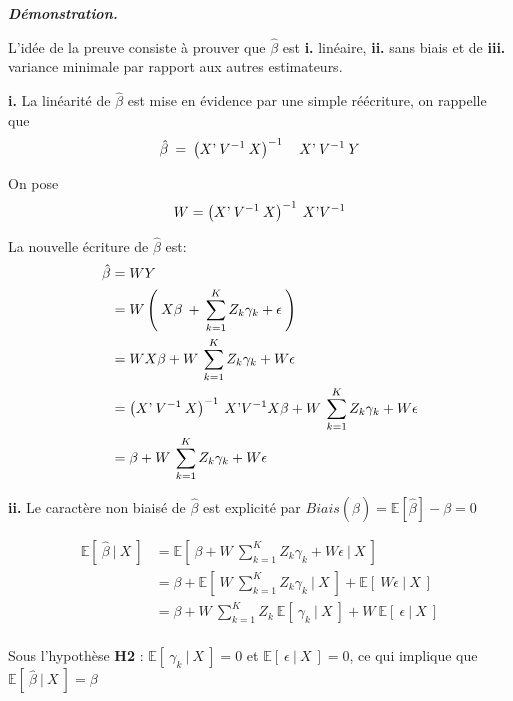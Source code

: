 \documentclass[12pt,fleqn]{book} %
\begin{document}
\vspace{1em}

\textbf{\textit{Démonstration.}}

\vspace{0.5em}

L'idée de la preuve consiste à prouver que $\hat{\beta}$ est \textbf{i.} linéaire, \textbf{ii.} sans biais et de \textbf{iii.} variance minimale par rapport aux autres estimateurs.

\vspace{0.5em}

\textbf{i.} La linéarité de $\hat{\beta}$ est mise en évidence par une simple réécriture, on rappelle que
\[
\hat{\beta}\:=\:\left(  X\textnormal{'}\:V^{-1} \: X \right)^{-1} \quad X\textnormal{'} \:V^{-1}\: Y
\]

On pose 
\[
W=\left(  X\textnormal{'}\:V^{-1} \: X \right)^{-1} \: X\textnormal{'}V^{-1}
\]

La nouvelle écriture de $\hat{\beta}$ est:
\begin{align*}
\hat{\beta} &= W Y\\
	&= W \left( \:X\beta\:+\:\sum_{k=1}^{K} Z_k \gamma_k + \epsilon\: \right) \\
    &= W X\beta+ W \:\sum_{k=1}^{K} Z_k \gamma_k +W\epsilon\\
    &= \left(  X\textnormal{'}\:V^{-1} \: X \right)^{-1} \: X\textnormal{'}V^{-1}X\beta + W \:\sum_{k=1}^{K} Z_k \gamma_k + W\epsilon\\
    &= \beta +  W \:\sum_{k=1}^{K} Z_k \gamma_k +W\epsilon 
\end{align*}


\vspace{0.5em}

\textbf{ii.} Le caractère non biaisé de $\hat{\beta}$ est explicité par $Biais(\hat{\beta})=\mathbb{E}[\hat{\beta}]-\beta=0$

\begin{align*}
\mathbb{E}[\:\hat{\beta}\:|\:X \:]&=\mathbb{E}[\:\beta +  W \:\sum_{k=1}^{K} Z_k \gamma_k + W\epsilon \:|\: X\: ]\\
	&= \beta + \mathbb{E}[\:W \:\sum_{k=1}^{K} Z_k \gamma_k  \:|\: X\:] + \mathbb{E}[\: W\epsilon \:|\: X\:]\\
    &=  \beta + W\:\sum_{k=1}^{K} Z_k \:\mathbb{E}[\: \gamma_k \:|\: X\:]+ W\:\mathbb{E}[\: \epsilon \:|\: X\:]\\
\end{align*}

Sous l'hypothèse \textbf{H2} : $\mathbb{E}[\: \gamma_k \:|\: X\:]=0$ \:et\: $\mathbb{E}[\: \epsilon \:|\: X\:]=0$, ce qui implique que $\mathbb{E}[\:\hat{\beta}\:|\:X \:]=\beta$\\
\end{document}
